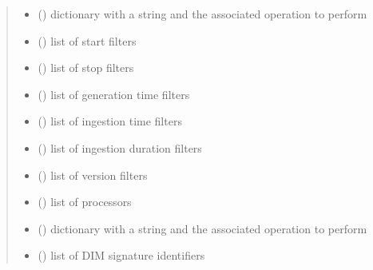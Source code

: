 \begin{fulllineitems}
\begin{fulllineitems}
\begin{quote}
\begin{description}
\begin{itemize}
\item {} 
 () \textendash{} dictionary with a string and the associated operation to perform

\item {} 
 () \textendash{} list of start filters

\item {} 
 () \textendash{} list of stop filters

\item {} 
 () \textendash{} list of generation time filters

\item {} 
 () \textendash{} list of ingestion time filters

\item {} 
 () \textendash{} list of ingestion duration filters

\item {} 
 () \textendash{} list of version filters

\item {} 
 () \textendash{} list of processors

\item {} 
 () \textendash{} dictionary with a string and the associated operation to perform

\item {} 
 () \textendash{} list of DIM signature identifiers


\end{itemize}
\end{description}
\end{quote}
\end{fulllineitems}
\end{fulllineitems}
